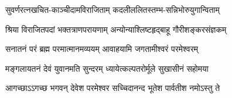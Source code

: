 \twolineshloka
{सुवर्णरत्नखचित-काञ्चीदामविराजिताम्}
{कदलीललितस्तम्भ-सन्निभोरुयुगान्विताम्}

\twolineshloka
{श्रिया विराजितपदां भक्तत्राणपरायणाम्}
{अन्योन्याश्लिष्टहृद्बाहू गौरीशङ्करसंज्ञकम्}

\twolineshloka
{सनातनं परं ब्रह्म परमात्मानमव्ययम्}
{आवाहयामि जगतामीश्वरं परमेश्वरम्}

\twolineshloka
{मङ्गलायतनं देवं युवानमति सुन्दरम्}
{ध्यायेत्कल्पतरोर्मूले सुखासीनं सहोमया}

\twolineshloka
{आगच्छाऽऽगच्छ भगवन् देवेश परमेश्वर}
{सच्चिदानन्द भूतेश पार्वतीश नमोऽस्तु ते}

{\small \closesection}












